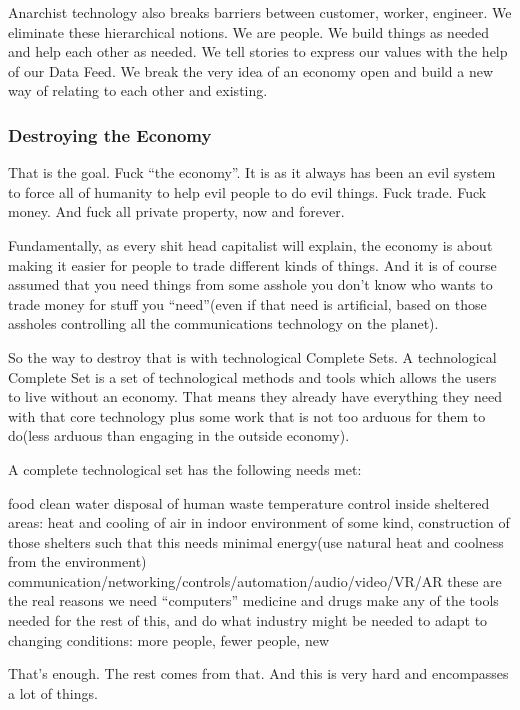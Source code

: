 Anarchist technology also breaks barriers between customer, worker,
engineer. We eliminate these hierarchical notions. We are people. We
build things as needed and help each other as needed. We tell stories to
express our values with the help of our Data Feed. We break the very
idea of an economy open and build a new way of relating to each other
and existing.

\subsubsection{Destroying the Economy}\label{destroying-the-economy}

That is the goal. Fuck ``the economy''. It is as it always has been an
evil system to force all of humanity to help evil people to do evil
things. Fuck trade. Fuck money. And fuck all private property, now and
forever.

Fundamentally, as every shit head capitalist will explain, the economy
is about making it easier for people to trade different kinds of things.
And it is of course assumed that you need things from some asshole you
don't know who wants to trade money for stuff you ``need''(even if that
need is artificial, based on those assholes controlling all the
communications technology on the planet).

So the way to destroy that is with technological Complete Sets. A
technological Complete Set is a set of technological methods and tools
which allows the users to live without an economy. That means they
already have everything they need with that core technology plus some
work that is not too arduous for them to do(less arduous than engaging
in the outside economy).

A complete technological set has the following needs met:

food clean water disposal of human waste temperature control inside
sheltered areas: heat and cooling of air in indoor environment of some
kind, construction of those shelters such that this needs minimal
energy(use natural heat and coolness from the environment)
communication/networking/controls/automation/audio/video/VR/AR these are
the real reasons we need ``computers'' medicine and drugs make any of
the tools needed for the rest of this, and do what industry might be
needed to adapt to changing conditions: more people, fewer people, new

That's enough. The rest comes from that. And this is very hard and
encompasses a lot of things.

